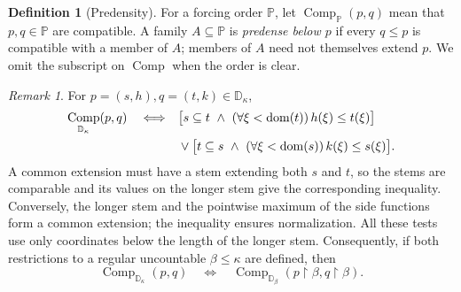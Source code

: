 \documentclass[10pt,a4paper]{amsart}
\theoremstyle{definition}
\newtheorem{definition}[theorem]{Definition}
\theoremstyle{remark}
\newtheorem{remark}[theorem]{Remark}
\newcommand{\D}{\mathbb D}
\DeclareMathOperator{\dom}{dom}
\DeclareMathOperator{\Comp}{Comp}
\begin{document}
\begin{definition}[Predensity]\label{def:compatibility}
\label{def:predensity}
For a forcing order \(\mathbb P\), let
\(\Comp_{\mathbb P}(p,q)\) mean that \(p,q\in\mathbb P\) are
compatible. A family \(A\subseteq\mathbb P\) is \emph{predense
below \(p\)} if every \(q\leq p\) is compatible with a member of
\(A\); members of \(A\) need not themselves extend \(p\).
We omit the subscript on \(\Comp\) when the order is clear.
\end{definition}

\begin{remark}\label{rem:compatibility}
For \(p=(s,h),q=(t,k)\in\D_\kappa\),
\begin{align}
 \Comp_{\D_\kappa}(p,q)\quad\Longleftrightarrow\quad
 &\bigl[s\subseteq t\ \land\
       (\forall\xi<\dom(t))\,h(\xi)\leq t(\xi)\bigr]\notag\\
 &{}\lor\bigl[t\subseteq s\ \land\
       (\forall\xi<\dom(s))\,k(\xi)\leq s(\xi)\bigr].
 \label{eq:compat}
\end{align}
A common extension must have a stem extending both \(s\) and \(t\),
so the stems are comparable and its values on the longer stem give
the corresponding inequality. Conversely, the longer stem and the
pointwise maximum of the side functions form a common extension;
the inequality ensures normalization. All these tests use only
coordinates below the length of the longer stem. Consequently, if
both restrictions to a regular uncountable \(\beta\leq\kappa\)
are defined, then
\[
 \Comp_{\D_\kappa}(p,q)
 \quad\Longleftrightarrow\quad
 \Comp_{\D_\beta}(p\restriction\beta,q\restriction\beta).
\]
\end{remark}
\end{document}
